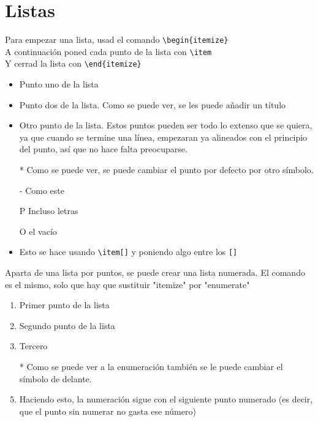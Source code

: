 \chapter{Listas}

Para empezar una lista, usad el comando \verb!\begin{itemize}! \\
A continuación poned cada punto de la lista con \verb!\item! \\
Y cerrad la lista con \verb!\end{itemize}!

\begin{itemize}
	\item Punto uno de la lista
	\item Punto dos de la lista. Como se puede ver, se les puede añadir un título
	\item Otro punto de la lista. Estos puntos pueden ser todo lo extenso que se quiera, ya que cuando se termine una línea, empezaran ya alineados con el principio del punto, así que no hace falta preocuparse.
	\item[*] Como se puede ver, se puede cambiar el punto por defecto por otro símbolo.
	\item[-] Como este
	\item[P] Incluso letras
	\item[] O el vacío
	\item Esto se hace usando \verb!\item[]! y poniendo algo entre los \verb![]!
	
\end{itemize}

Aparta de una lista por puntos, se puede crear una lista numerada. El comando es el mismo, solo que hay que sustituir "itemize" por "enumerate"

\begin{enumerate}
	\item Primer punto de la lista
	\item Segundo punto de la lista
	\item Tercero
	\item[*] Como se puede ver a la enumeración también se le puede cambiar el símbolo de delante.
	\item Haciendo esto, la numeración sigue con el siguiente punto numerado (es decir, que el punto sin numerar no gasta ese número)
\end{enumerate}